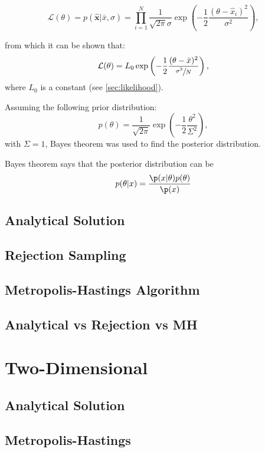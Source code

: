 \documentclass[a4paper,11pt,twoside]{article}
\begin{document}
\begin{equation}
	\label{eq:rawlikelihood}
	\mathcal{L}(\theta) = p(\hat{\mathbf{x}}|\bar{x},\sigma) = \prod_{i=1}^{N} \frac{1}{\sqrt{2\pi}\sigma}\exp\left(-\frac{1}{2}\frac{(\theta - \hat{x}_i)^2}{\sigma^2}\right),
\end{equation}

from which it can be shown that:
\begin{equation}
	\label{eq:likelihood}
	\mathcal{L}(\theta) = L_0\exp\left(-\frac{1}{2}\frac{(\theta - \bar{x})^2}{\sfrac{\sigma^2}{N}}\right),
\end{equation}
where $L_0$ is a constant (see \cref{sec:likelihood}).

Assuming the following prior distribution:
\begin{equation}
	\label{eq:prior}
	p(\theta) =  \frac{1}{\sqrt{2\pi}}\exp\left(-\frac{1}{2}\frac{\theta^2}{\Sigma^2}\right),
\end{equation}
with $\Sigma = 1$, Bayes theorem was used to find the posterior distribution.

Bayes theorem says that the posterior distribution can be 
\begin{equation}
	\label{eq:bayes}
	p(\theta|x) = \frac{\p(x|\theta)p(\theta)}{\p(x)}
\end{equation}

\subsection{Analytical Solution}
\subsection{Rejection Sampling} 
\subsection{Metropolis-Hastings Algorithm} 
\subsection{Analytical vs Rejection vs MH}

\section{Two-Dimensional} 
\subsection{Analytical Solution}
\subsection{Metropolis-Hastings} 
\end{document}
